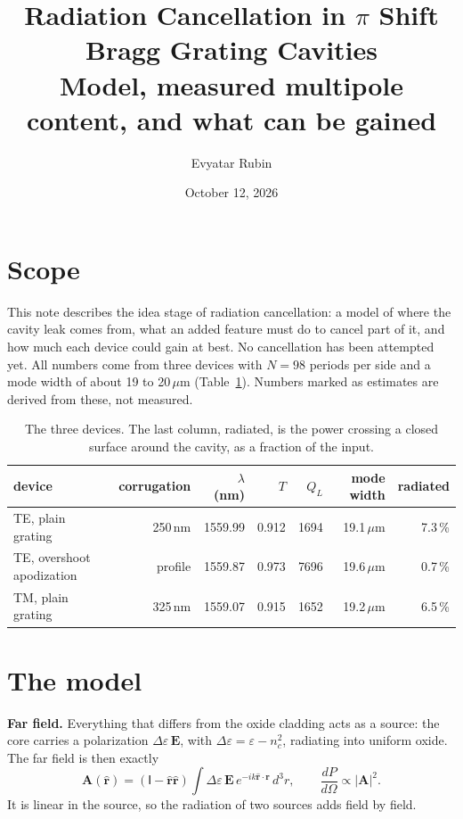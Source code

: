 \documentclass[11pt]{article}
\title{Radiation Cancellation in $\pi$ Shift Bragg Grating Cavities\\[0.2em]\large Model, measured multipole content, and what can be gained}
\author{Evyatar Rubin}
\date{October 12, 2026}
\begin{document}
\maketitle

\section*{Scope}
This note describes the idea stage of radiation cancellation: a model of where the cavity leak comes from, what an added feature must do to cancel part of it, and how much each device could gain at best. No cancellation has been attempted yet. All numbers come from three devices with $N=98$ periods per side and a mode width of about 19 to 20\,$\mu$m (Table~\ref{tab:devices}). Numbers marked as estimates are derived from these, not measured.

\begin{table}[H]
\centering\small
\begin{tabular}{lrrrrrr}
\toprule
device & corrugation & $\lambda$ (nm) & $T$ & $Q_L$ & mode width & radiated \\
\midrule
TE, plain grating & 250\,nm & 1559.99 & 0.912 & 1694 & 19.1\,$\mu$m & 7.3\,\% \\
TE, overshoot apodization & profile & 1559.87 & 0.973 & 7696 & 19.6\,$\mu$m & 0.7\,\% \\
TM, plain grating & 325\,nm & 1559.07 & 0.915 & 1652 & 19.2\,$\mu$m & 6.5\,\% \\
\bottomrule
\end{tabular}
\caption{The three devices. The last column, radiated, is the power crossing a closed surface around the cavity, as a fraction of the input.}
\label{tab:devices}
\end{table}

\section{The model}
\textbf{Far field.} Everything that differs from the oxide cladding acts as a source: the core carries a polarization $\Delta\varepsilon\,\mathbf E$, with $\Delta\varepsilon=\varepsilon-n_c^2$, radiating into uniform oxide. The far field is then exactly
\begin{equation}
\mathbf A(\hat{\mathbf r})=(\mathsf I-\hat{\mathbf r}\hat{\mathbf r})\int\Delta\varepsilon\,\mathbf E\,e^{-ik\hat{\mathbf r}\cdot\mathbf r}\,d^3r,\qquad \frac{dP}{d\Omega}\propto|\mathbf A|^2 .
\end{equation}
It is linear in the source, so the radiation of two sources adds field by field.
\end{document}
